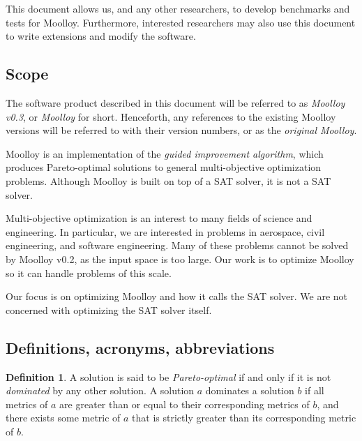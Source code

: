 \documentclass[11pt]{article}
\theoremstyle{definition}
\newtheorem{mydef}{Definition}
\begin{document}
This document allows us, and any other researchers, to develop
benchmarks and tests for Moolloy. Furthermore, interested researchers
may also use this document to write extensions and modify the software.

\subsection{Scope}\label{sec:scope}

The software product described in this document will be referred to as
\textit{Moolloy v0.3}, or \textit{Moolloy} for short. Henceforth, any
references to the existing Moolloy versions will be referred to with
their version numbers, or as the \textit{original Moolloy}.

Moolloy is an implementation of the \textit{guided improvement
algorithm}, which produces Pareto-optimal solutions to general
multi-objective optimization problems. Although Moolloy is built on top
of a SAT solver, it is not a SAT solver.

Multi-objective optimization is an interest to many fields of science
and engineering. In particular, we are interested in problems in
aerospace, civil engineering, and software engineering. Many of these
problems cannot be solved by Moolloy v0.2, as the input space is too
large. Our work is to optimize Moolloy so it can handle problems of
this scale.

Our focus is on optimizing Moolloy and how it calls the SAT solver. We
are not concerned with optimizing the SAT solver itself.

\subsection{Definitions, acronyms, abbreviations}\label{sec:def}

\begin{mydef}
A solution is said to be \textit{Pareto-optimal} if and only if it is
not \textit{dominated} by any other solution. A solution $a$ dominates
a solution $b$ if all metrics of $a$ are greater than or equal to their
corresponding metrics of $b$, and there exists some metric of $a$ that
is strictly greater than its corresponding metric of $b$.
\end{mydef}
\end{document}
